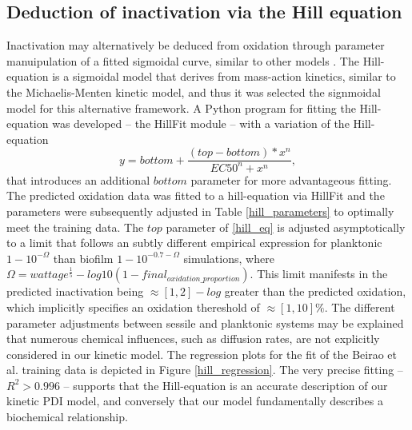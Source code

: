 \subsection{Deduction of inactivation via the Hill equation}

Inactivation may alternatively be deduced from oxidation through parameter manuipulation of a fitted sigmoidal curve, similar to other models \cite{Xiong1999AInactivation}. The Hill-equation \cite{Gesztelyi2012ThePharmacology} is a sigmoidal model that derives from mass-action kinetics, similar to the Michaelis-Menten kinetic model, and thus it was selected the signmoidal model for this alternative framework. A Python program for fitting the Hill-equation was developed -- the HillFit module -- with a variation of the Hill-equation \cite{Inoue2016OscillationActivation} 
\begin{equation} \label{hill_eq}
    y=bottom+\frac{(top-bottom)*x^n}{EC50^n+x^n},
\end{equation}
that introduces an additional $bottom$ parameter for more advantageous fitting. The predicted oxidation data was fitted to a hill-equation via HillFit and the parameters were subsequently adjusted in Table \ref{hill_parameters} to optimally meet the training data. The $top$ parameter of \cref{hill_eq} is adjusted asymptotically to a limit that follows an subtly different empirical expression for planktonic $1-10^{-\Omega}$ than biofilm $1-10^{-0.7-\Omega }$ simulations, where $\Omega = wattage^{\frac{1}{5}}-log10(1-final_{oxidation\_proportion})$. This limit manifests in the predicted inactivation being $\approx [1,2]-log$ greater than the predicted oxidation, which implicitly specifies an oxidation thereshold of $\approx [1,10]\%$. The different parameter adjustments between sessile and planktonic systems may be explained that numerous chemical influences, such as diffusion rates, are not explicitly considered in our kinetic model. The regression plots for the fit of the Beirao et al. training data is depicted in Figure \ref{hill_regression}. The very precise fitting -- $R^2 > 0.996$ -- supports that the Hill-equation is an accurate description of our kinetic PDI model, and conversely that our model fundamentally describes a biochemical relationship.

